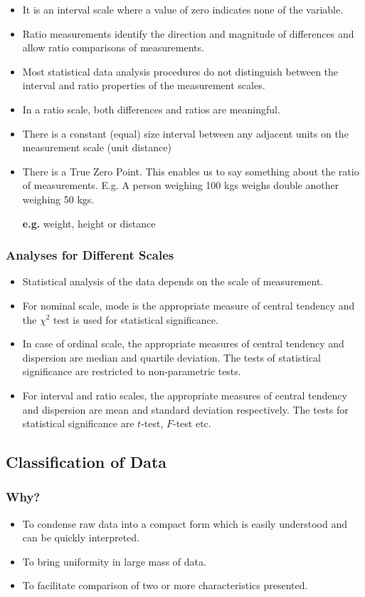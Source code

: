 \documentclass[
10pt, %
a4paper, %
]{report}
\begin{document}
\begin{description}
\begin{itemize}
\item It is an interval scale where a value of zero indicates none of the variable.
\item Ratio measurements identify the direction and magnitude of differences and allow ratio comparisons of measurements.
\item Most statistical data analysis procedures do not distinguish between the interval and ratio properties of the measurement scales.
\item In a ratio scale, both differences and ratios are meaningful.
\item There is a constant (equal) size interval between any adjacent units on the measurement scale (unit distance)
\item There is a True Zero Point. This enables us to say something about the ratio of measurements. E.g. A person weighing 100 kgs weighs double another weighing 50 kgs.
\item[\textbf{e.g.}] weight, height or distance
\end{itemize}
\end{description}

\subsubsection*{Analyses for Different Scales}
\begin{itemize}
\item Statistical analysis of the data depends on the scale of measurement.
\item For nominal scale, mode is the appropriate measure of central tendency and the \(\chi^2\) test is used for statistical significance.
\item In case of ordinal scale, the appropriate measures of central tendency and dispersion are median and quartile deviation. The tests of statistical significance are restricted to non-parametric tests.
\item For interval and ratio scales, the appropriate measures of central tendency and dispersion are mean and standard deviation respectively. The tests for statistical significance are \(t\)-test, \(F\)-test etc.
\end{itemize}

\subsection*{Classification of Data}

\subsubsection*{Why?}
\begin{itemize}
\item To condense raw data into a compact form which is easily understood and can be quickly interpreted.
\item To bring uniformity in large mass of data.
\item To facilitate comparison of two or more characteristics presented.
\end{itemize}
\end{document}
